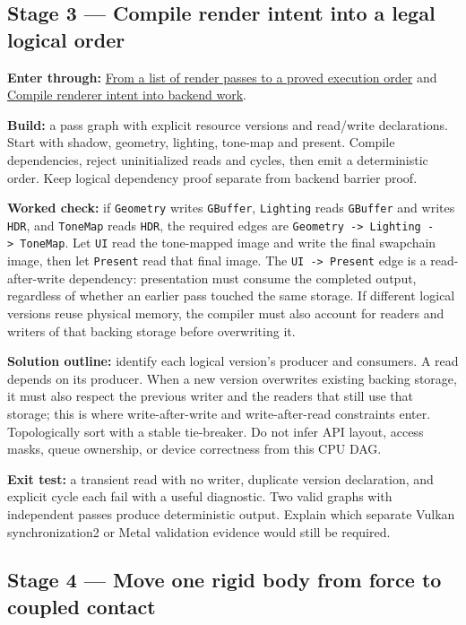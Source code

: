 \subsection{Stage 3 --- Compile render intent into a legal logical order}\label{stage-3-compile-render-intent-into-a-legal-logical-order}

\textbf{Enter through:} \hyperref[06-engine-ii-ch042]{From a list of render passes to a proved execution order} and \hyperref[06-engine-ii-ch043]{Compile renderer intent into backend work}.

\textbf{Build:} a pass graph with explicit resource versions and read/write declarations. Start with shadow, geometry, lighting, tone-map and present. Compile dependencies, reject uninitialized reads and cycles, then emit a deterministic order. Keep logical dependency proof separate from backend barrier proof.

\textbf{Worked check:} if \texttt{Geometry} writes \texttt{GBuffer}, \texttt{Lighting} reads \texttt{GBuffer} and writes \texttt{HDR}, and \texttt{ToneMap} reads \texttt{HDR}, the required edges are \texttt{Geometry\ -\textgreater{}\ Lighting\ -\textgreater{}\ ToneMap}. Let \texttt{UI} read the tone-mapped image and write the final swapchain image, then let \texttt{Present} read that final image. The \texttt{UI\ -\textgreater{}\ Present} edge is a read-after-write dependency: presentation must consume the completed output, regardless of whether an earlier pass touched the same storage. If different logical versions reuse physical memory, the compiler must also account for readers and writers of that backing storage before overwriting it.

\textbf{Solution outline:} identify each logical version's producer and consumers. A read depends on its producer. When a new version overwrites existing backing storage, it must also respect the previous writer and the readers that still use that storage; this is where write-after-write and write-after-read constraints enter. Topologically sort with a stable tie-breaker. Do not infer API layout, access masks, queue ownership, or device correctness from this CPU DAG.

\textbf{Exit test:} a transient read with no writer, duplicate version declaration, and explicit cycle each fail with a useful diagnostic. Two valid graphs with independent passes produce deterministic output. Explain which separate Vulkan synchronization2 or Metal validation evidence would still be required.

\subsection{Stage 4 --- Move one rigid body from force to coupled contact}\label{stage-4-move-one-rigid-body-from-force-to-coupled-contact}

